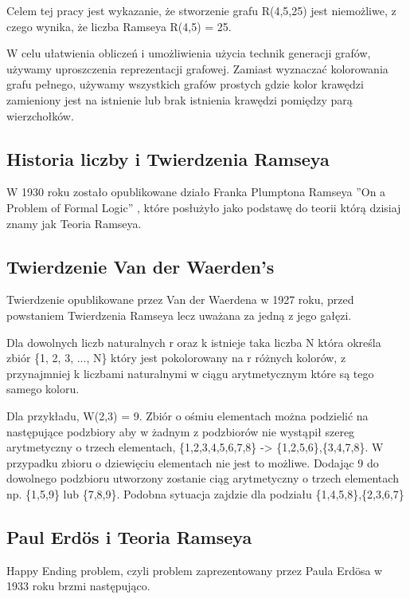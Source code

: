 Celem tej pracy jest wykazanie, że stworzenie grafu R(4,5,25) jest niemożliwe, z czego wynika, że liczba Ramseya R(4,5) = 25.

W celu ułatwienia obliczeń i umożliwienia użycia technik generacji grafów, używamy uproszczenia reprezentacji grafowej. Zamiast wyznaczać kolorowania grafu pełnego, używamy wszystkich grafów prostych gdzie kolor krawędzi zamieniony jest na istnienie lub brak istnienia krawędzi pomiędzy parą wierzchołków.

\subsection{Historia liczby i Twierdzenia Ramseya}

W 1930 roku zostało opublikowane działo Franka Plumptona Ramseya ''On a Problem of Formal Logic''\cite{ramsey} , które posłużyło jako podstawę do teorii którą dzisiaj znamy jak Teoria Ramseya. 


\subsection{Twierdzenie Van der Waerden's}
Twierdzenie opublikowane przez Van der Waerdena w 1927 roku, przed powstaniem Twierdzenia Ramseya lecz uważana za jedną z jego gałęzi. 

\begin{theorem}
Dla dowolnych liczb naturalnych r oraz k istnieje taka liczba N która określa zbiór \{1, 2, 3, ..., N\} który jest pokolorowany na r różnych kolorów, z przynajmniej k liczbami naturalnymi w ciągu arytmetycznym które są tego samego koloru.\cite{theory} 
\end{theorem}

Dla przykładu, W(2,3) = 9. Zbiór o ośmiu elementach można podzielić na następujące podzbiory aby w żadnym z podzbiorów nie wystąpił szereg arytmetyczny o trzech elementach, \{1,2,3,4,5,6,7,8\} -> \{1,2,5,6\},\{3,4,7,8\}. W przypadku zbioru o dziewięciu elementach nie jest to możliwe. Dodając 9 do dowolnego podzbioru utworzony zostanie ciąg arytmetyczny o trzech elementach np. \{1,5,9\} lub \{7,8,9\}. Podobna sytuacja zajdzie dla podziału \{1,4,5,8\},\{2,3,6,7\}

\subsection{Paul Erd\"os i Teoria Ramseya}

Happy Ending problem, czyli problem zaprezentowany przez Paula Erd\"osa w 1933 roku brzmi następująco. 

